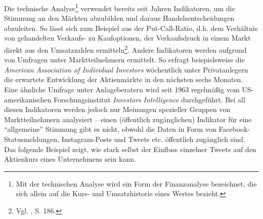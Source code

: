 \documentclass[
	a4paper,
	12pt,
	bibliography=totocnumbered,
	twoside,
]{scrreprt}
\begin{document}
Die technische Analyse\footnote{Mit der technischen Analyse wird ein Form der Finanzanalyse bezeichnet, die sich allein auf die Kurs- und Umsatzhistorie eines Wertes bezieht.} verwendet bereits seit Jahren Indikatoren, um die Stimmung an den Märkten abzubilden und daraus Handelsentscheidungen abzuleiten. So lässt sich zum Beispiel aus der Put-Call-Ratio, d.h. dem Verhältnis von gehandelten Verkaufs- zu Kaufoptionen, der Verkaufsdruck in einem Markt direkt aus den Umsatzzahlen ermitteln\footnote{Vgl. \citet{murphy2014}, S. 186.}. Andere Indikatoren werden aufgrund von Umfragen unter Marktteilnehmern ermittelt. So erfragt beispielsweise die \textit{American Association of Individual Investors} wöchentlich unter Privatanlegern die erwartete Entwicklung der Aktienmärkte in den nächsten sechs Monaten. Eine ähnliche Umfrage unter Anlageberatern wird seit 1963 regelmäßig vom US-amerikanischen Forschungsinstitut \textit{Investors Intelligence} durchgeführt.
Bei all diesen Indikatoren werden jedoch nur Meinungen spezieller Gruppen von Marktteilnehmern analysiert -- einen (öffentlich zugänglichen) Indikator für eine "`allgemeine"' Stimmung gibt es nicht, obwohl die Daten in Form von Facebook-Statusmeldungen, Instagram-Posts und Tweets etc. öffentlich zugänglich sind. Das folgende Beispiel zeigt, wie stark selbst der Einfluss einzelner Tweets auf den Aktienkurs eines Unternehmens sein kann.\\
\end{document}
